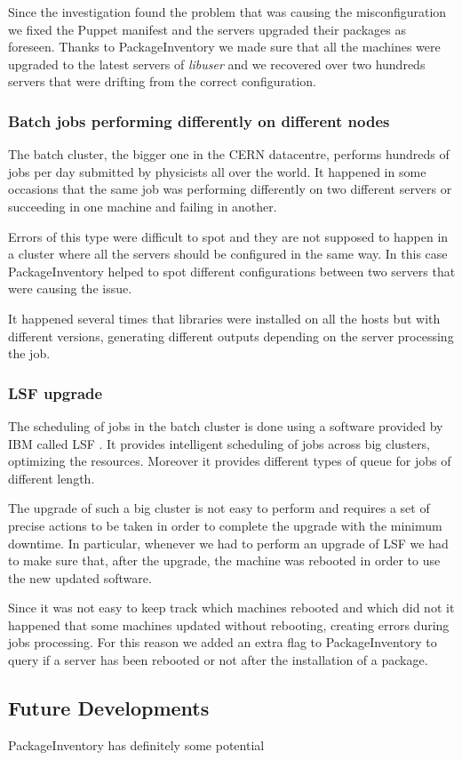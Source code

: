   Since the investigation found the problem that was causing the
  misconfiguration we fixed the Puppet manifest and the servers upgraded
  their packages as foreseen. Thanks to PackageInventory we made sure that
  all the machines were upgraded to the latest servers of \textit{libuser}
  and we recovered over two hundreds servers that were drifting from the
  correct configuration.

  \subsubsection{Batch jobs performing differently on different nodes}

  The batch cluster, the bigger one in the CERN datacentre, performs
  hundreds of jobs per day submitted by physicists all over the world. It
  happened in some occasions that the same job was performing differently
  on two different servers or succeeding in one machine and failing in
  another.

  Errors of this type were difficult to spot and they are not supposed to
  happen in a cluster where all the servers should be configured in the
  same way. In this case PackageInventory helped to spot different
  configurations between two servers that were causing the issue.

  It happened several times that libraries were installed on all the hosts
  but with different versions, generating different outputs depending on
  the server processing the job.

  \subsubsection{LSF upgrade}

  The scheduling of jobs in the batch cluster is done using a software
  provided by IBM called LSF \cite{ibm-lsf}. It provides intelligent
  scheduling of jobs across big clusters, optimizing the resources.
  Moreover it provides different types of queue for jobs of different
  length.

  The upgrade of such a big cluster is not easy to perform and requires
  a set of precise actions to be taken in order to complete the upgrade
  with the minimum downtime. In particular, whenever we had to perform an
  upgrade of LSF we had to make sure that, after the upgrade, the machine
  was rebooted in order to use the new updated software.

  Since it was not easy to keep track which machines rebooted and which
  did not it happened that some machines updated without rebooting,
  creating errors during jobs processing. For this reason we added an
  extra flag to PackageInventory to query if a server has been rebooted or
  not after the installation of a package.

\subsection{Future Developments}

PackageInventory has definitely some potential


